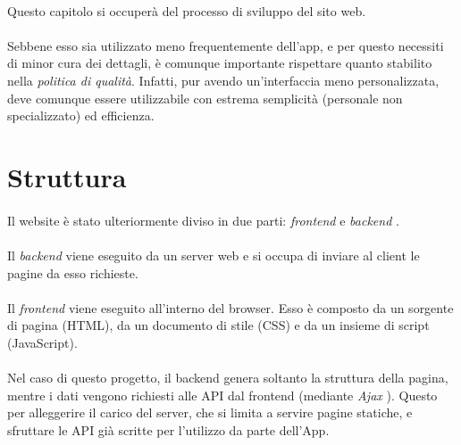 \documentclass[12pt,a4paper,twoside,english,italian]{book}
\begin{document}
\paragraph{} Questo capitolo si occuperà del processo di sviluppo del sito web. 

\paragraph{} Sebbene esso sia utilizzato meno frequentemente dell'app, e per questo necessiti di minor cura dei dettagli, è comunque importante rispettare quanto stabilito nella \emph{politica di qualità}. Infatti, pur avendo un'interfaccia meno personalizzata, deve comunque essere utilizzabile con estrema semplicità (personale non specializzato) ed efficienza.

\section{Struttura}

\paragraph{} Il website è stato ulteriormente diviso in due parti: \emph{frontend} e \emph{backend} \cite{frontend_vs_backend}. 

\paragraph{} Il \emph{backend} viene eseguito da un server web e si occupa di inviare al client le pagine da esso richieste. 

\paragraph{} Il \emph{frontend} viene eseguito all'interno del browser. Esso è composto da un sorgente di pagina (HTML), da un documento di stile (CSS) e da un insieme di script (JavaScript). 

\paragraph{} Nel caso di questo progetto, il backend genera soltanto la struttura della pagina, mentre i dati vengono richiesti alle API dal frontend (mediante \emph{Ajax} \cite{ajax}). Questo per alleggerire il carico del server, che si limita a servire pagine statiche, e sfruttare le API già scritte per l'utilizzo da parte dell'App. 
\end{document}
